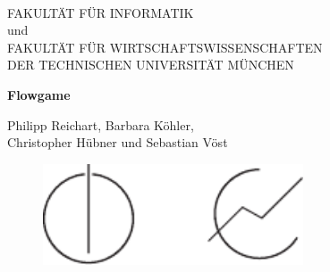 \thispagestyle{empty}

\vspace{4cm}
\begin{center}
\oTUM{4cm}\\ 
\vspace{5mm}     
\huge FAKULT{\"A}T F{\"U}R INFORMATIK\\
und\\
FAKULT{\"A}T F{\"U}R WIRTSCHAFTSWISSENSCHAFTEN\\

 
\vspace{0.5cm}
\large DER TECHNISCHEN UNIVERSIT{\"A}T M{\"U}NCHEN\\
\vspace{1mm}
\end{center}

\vspace{10mm}

\begin{center}
\Large \doctype
\vspace{15mm}

\begin{spacing}{1.5}
\huge\bf Flowgame\\%
\end{spacing}

\vspace{10mm}
\LARGE Philipp Reichart, Barbara K{\"o}hler,\\ Christopher
H{\"u}bner und Sebastian V{\"o}st

\vspace{10mm}

\begin{figure}[h!]
\centering
\includegraphics[height=3cm]{styles/info.pdf}
\end{figure}

\end{center}
